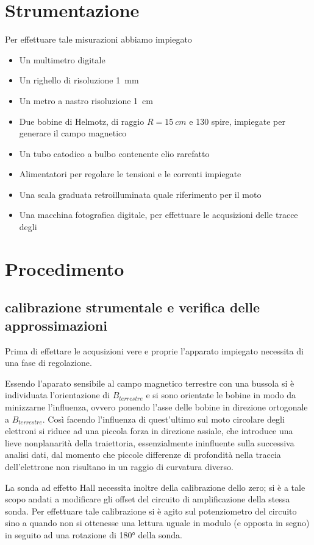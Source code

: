 \section{Strumentazione}
	Per effettuare tale misurazioni abbiamo impiegato
	\begin{itemize}[$\cdot$]
		\item Un multimetro digitale
		\item Un righello di risoluzione \SI{1}{\mm}
		\item Un metro a nastro risoluzione \SI{1}{\cm}
		\item Due bobine di Helmotz, di raggio $R = \SI{15}{cm}$ e 130 spire, impiegate per generare il campo magnetico
		\item Un tubo catodico a bulbo contenente elio rarefatto
		\item Alimentatori per regolare le tensioni e le correnti impiegate
		\item Una scala graduata retroilluminata quale riferimento per il moto
		\item Una macchina fotografica digitale, per effettuare le acqusizioni
		delle tracce degli \e
	\end{itemize}
\section{Procedimento}
	\subsection{calibrazione strumentale e verifica delle approssimazioni}
		Prima di effettare le acqusizioni vere e proprie l'apparato impiegato necessita di una
		fase di regolazione.

		Essendo l'aparato sensibile al campo magnetico terrestre
		con una bussola si è individuata l'orientazione di $B_{terrestre}$
		e si sono orientate le bobine in modo da minizzarne l'influenza, ovvero ponendo
		l'asse delle bobine in direzione ortogonale a $B_{terrestre}$. Così facendo l'influenza
		di quest'ultimo sul moto circolare degli elettroni si riduce ad una
		piccola forza in direzione assiale, che introduce una lieve nonplanarità della traiettoria,
		essenzialmente ininfluente sulla successiva analisi dati, dal momento che
		piccole differenze di profondità nella traccia dell'elettrone non risultano
		in un raggio di curvatura diverso.

		La sonda ad effetto Hall necessita inoltre della calibrazione dello zero;
		si è a tale scopo andati a modificare gli offset del circuito di amplificazione della stessa sonda.
		Per effettuare tale calibrazione si è agito sul potenziometro del circuito sino
		a quando non si ottenesse una lettura uguale in modulo (e opposta in segno)
		in seguito ad una rotazione di \ang{180} della sonda.

